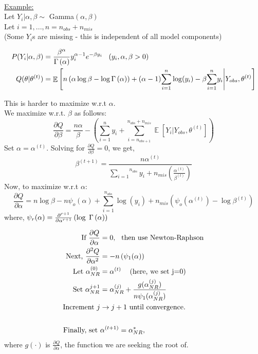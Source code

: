 \documentclass[12pt]{article}
\DeclareMathOperator*{\E}{\mathbb{E}}
\begin{document}
\uline{\\Example:}\\ Let $Y_i\Bigr\rvert \alpha, \beta \sim$ Gamma$(\alpha, \beta)$\\
Let $i=1, . . . , n = n_{obs} + n_{mis}$\\
(Some $Y_i$s are missing - this is independent of all model components)

\begin{align*}
P(Y_i|\alpha, \beta) & = \frac{\beta^{\alpha}}{\Gamma \left( \alpha \right)}y_i^{\alpha - 1}e^{- \beta y_i} \text{\hspace{3 mm}}(y_i, \alpha, \beta > 0)\\
Q(\theta|\theta^{(t)}) &= \E \left[ n \left( \alpha \log\beta - \log \Gamma \left( \alpha \right) \right)+ (\alpha-1)\overset{n}{\underset{i=1}{\sum}}\log(y_i) - \beta\overset{n}{\underset{i=1}{\sum}}y_i \Biggr\rvert Y_{obs}, \theta^{(t)}\right]\\
\end{align*}

This is harder to maximize w.r.t $\alpha$.\\
We maximize w.r.t. $\beta$ as follows:
$$
\frac{\partial Q}{\partial \beta} = \frac{n\alpha}{\beta}-\left( \overset{n}{\underset{i=1}{\sum}}y_i + \overset{n_{obs}+n_{mis}}{\underset{i=n_{obs+1}}{\sum}}\E[Y_i|Y_{obs}, \theta^{(t)}] \right)
$$
Set $\alpha=\alpha^{(t)}$.  Solving for $\frac{\partial Q}{\partial \beta}=0$, we get,
$$
\beta^{(t+1)}=\frac{n\alpha^{(t)}}{\overset{n_{obs}}{\underset{i=1}{\sum}}y_i+n_{mis}\left(\frac{\alpha^{(t)}}{\beta^{(t)}}\right)}
$$
Now, to maximize w.r.t $\alpha$:
$$
\frac{\partial Q}{\partial \alpha}=n\log\beta-n \psi_o(\alpha)+\overset{n_{obs}}{\underset{i=1}{\sum}}\log(y_i)+n_{mis}\left( \psi_o(\alpha^{(t)})-\log\beta^{(t)}   \right)
$$
where, $\psi_r(\alpha)=\frac{\partial ^{r+1}}{\partial \alpha^{r+1} }\left(\log\hspace{1 mm}\Gamma\left( \alpha \right)\right)$

\begin{align*}
\text{If }\frac{\partial Q}{\partial \alpha}&=0 \text{,\hspace{3 mm}then use Newton-Raphson}\\
\text{Next, }\frac{\partial ^2Q}{\partial \alpha^2}&=-n\left( \psi_1(\alpha) \right)\\
\text{Let } \alpha_{NR}^{(0)}&=\alpha^{(t)} \text{\hspace{3 mm}   (here, we set j=0)}\\
\text{Set } \alpha_{NR}^{j+1}&=\alpha_{NR}^{(j)}+\frac{g(\alpha_{NR}^{(j)})}{n\psi_1( \alpha_{NR}^{(j)})}\\
\text{Increment } j &\rightarrow j+1 \text{ until convergence.}\\
\\
\text{Finally, set } &\alpha^{(t+1)}=\alpha_{NR}^{*} ,
\end{align*}
where $g(\cdot)$ is $\frac{\partial{}Q}{\partial\alpha}$, the function we are seeking the root of.
\end{document}
